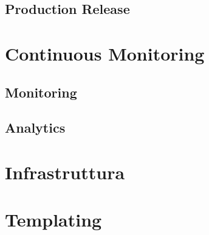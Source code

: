 \subsection{Production Release}

\section{Continuous Monitoring}
\subsection{Monitoring}
\subsection{Analytics}

\section{Infrastruttura}

\section{Templating}
